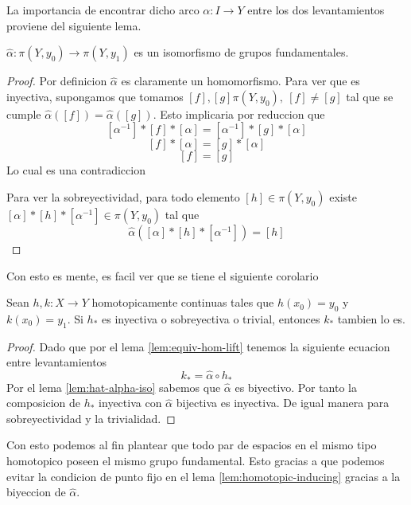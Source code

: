 La importancia de encontrar dicho arco \(\alpha : I \to Y\) entre los
dos levantamientos proviene del siguiente lema.
\begin{lema} \label{lem:hat-alpha-iso}
\(\hat \alpha : \pi (Y, y_0) \to \pi (Y, y_1)\) es un isomorfismo de
grupos fundamentales.
\end{lema}
\begin{proof}
  Por definicion \(\hat \alpha\) es claramente un homomorfismo. Para ver
  que es inyectiva, supongamos que tomamos \([f],[g] \pi (Y, y_0),\ [f]
  \neq [g]\) tal que se cumple \(\hat \alpha ([f]) = \hat \alpha
  ([g])\). Esto implicaria por reduccion que
  \[ [\alpha^{-1}] * [f] * [\alpha] = [\alpha^{-1}] * [g] * [\alpha] \]
  \[ [f] * [\alpha] = [g] * [\alpha] \]
  \[ [f] = [g] \]
  Lo cual es una contradiccion

  Para ver la sobreyectividad, para todo elemento \([h]
  \in \pi (Y,y_0)\) existe \( [\alpha] * [h] * [\alpha^{-1}] \in \pi
  (Y,y_0)\) tal que
  \[ \hat \alpha ([\alpha] * [h] * [\alpha^{-1}]) = [h]\]
\end{proof}
Con esto es mente, es facil ver que se tiene el siguiente corolario
\begin{corolario}
  Sean \(h,k : X \to Y\) homotopicamente continuas tales que \(h (x_0) =
  y_0\) y \(k(x_0) = y_1\). Si \(h_*\) es inyectiva o sobreyectiva o
  trivial, entonces \(k_*\) tambien lo es.
\end{corolario}
\begin{proof}
  Dado que por el lema \ref{lem:equiv-hom-lift} tenemos la siguiente
  ecuacion entre levantamientos
  \[ k_* = \hat \alpha \circ h_* \]
  Por el lema \ref{lem:hat-alpha-iso} sabemos que \(\hat \alpha\) es
  biyectivo. Por tanto la composicion de \(h_*\) inyectiva con \(\hat
  \alpha\) bijectiva es inyectiva. De igual manera para sobreyectividad y
  la trivialidad.
\end{proof}
Con esto podemos al fin plantear que todo par de espacios en el mismo
tipo homotopico poseen el mismo grupo fundamental. Esto gracias a que
podemos evitar la condicion de punto fijo en el lema
\ref{lem:homotopic-inducing} gracias a la biyeccion de \(\hat \alpha\).

